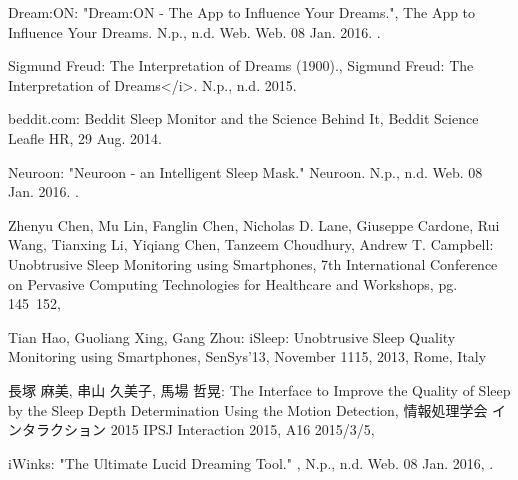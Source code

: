 \begin{bib}[100]
\begin{flushleft}
  Dream:ON:
  \newblock "Dream:ON - The App to Influence Your Dreams.",
  \newblock The App to Influence Your Dreams. N.p., n.d. Web.
  \newblock Web. 08 Jan. 2016.
  .
\end{flushleft}

\begin{flushleft}
  Sigmund Freud:
  \newblock The Interpretation of Dreams (1900).,
  \newblock Sigmund Freud: The Interpretation of Dreams</i>. N.p., n.d. 2015.
\end{flushleft}

\begin{flushleft}
  beddit.com:
  \newblock Beddit Sleep Monitor and the Science Behind It,
  \newblock Beddit Science Leafle HR, 29 Aug. 2014.
\end{flushleft}

\begin{flushleft}
  Neuroon:
  \newblock  "Neuroon - an Intelligent Sleep Mask."
  \newblock Neuroon. N.p., n.d. Web. 08 Jan. 2016.
  .
\end{flushleft}

\begin{flushleft}
  Zhenyu Chen, Mu Lin, Fanglin Chen, Nicholas D. Lane, Giuseppe Cardone, Rui Wang, Tianxing Li, Yiqiang Chen, Tanzeem Choudhury, Andrew T. Campbell:
  \newblock  Unobtrusive Sleep Monitoring using Smartphones,
   7th International Conference on Pervasive Computing Technologies for Healthcare and Workshops, pg. 145~152,
\end{flushleft}

\begin{flushleft}
  Tian Hao, Guoliang Xing, Gang Zhou:
  \newblock  iSleep: Unobtrusive Sleep Quality Monitoring using Smartphones,
  \newblock SenSys’13,
  \newblock  November 1115, 2013, Rome, Italy
\end{flushleft}

\begin{flushleft}
  長塚 麻美, 串山 久美子, 馬場 哲晃:
  \newblock  The Interface to Improve the Quality of Sleep by the Sleep Depth Determination Using the Motion Detection,
  \newblock 情報処理学会 インタラクション 2015 IPSJ Interaction 2015,
  \newblock  A16 2015/3/5,
\end{flushleft}

\begin{flushleft}
iWinks:
 \newblock  "The Ultimate Lucid Dreaming Tool." ,
  \newblock N.p., n.d. Web. 08 Jan. 2016,
  .
\end{flushleft}

\end{bib}